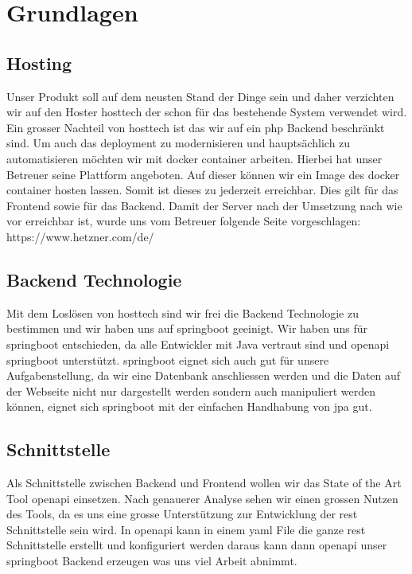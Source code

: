 \documentclass[../main.tex]{subfiles}
\begin{document}
	\section{Grundlagen}
	
	\subsection{Hosting}
	Unser Produkt soll auf dem neusten Stand der Dinge sein und daher verzichten wir auf den Hoster \gls{hosttech} der schon für das bestehende System verwendet wird. Ein grosser Nachteil von \gls{hosttech} ist das wir auf ein \gls{php} Backend beschränkt sind. Um auch das \gls{deployment} zu modernisieren und hauptsächlich zu automatisieren möchten wir mit \gls{docker} \gls{container} arbeiten. Hierbei hat unser Betreuer seine Plattform angeboten. Auf dieser können wir ein Image des \gls{docker} \gls{container} hosten lassen. Somit ist dieses zu jederzeit erreichbar. Dies gilt für das Frontend sowie für das Backend.
	Damit der Server nach der Umsetzung nach wie vor erreichbar ist, wurde uns vom Betreuer folgende Seite vorgeschlagen: https://www.hetzner.com/de/
	
	\subsection{Backend Technologie}
	Mit dem Loslösen von \gls{hosttech} sind wir frei die Backend Technologie zu bestimmen und wir haben uns auf \gls{springboot} geeinigt. Wir haben uns für \gls{springboot} entschieden, da alle Entwickler mit Java vertraut sind und \gls{openapi} \gls{springboot} unterstützt. \gls{springboot} eignet sich auch gut für unsere Aufgabenstellung, da wir eine Datenbank anschliessen werden und die Daten auf der Webseite nicht nur dargestellt werden sondern auch manipuliert werden können, eignet sich \gls{springboot} mit der einfachen Handhabung von \gls{jpa} gut.
	
	\subsection{Schnittstelle}
	Als Schnittstelle zwischen Backend und Frontend wollen wir das State of the Art Tool \gls{openapi} einsetzen. Nach genauerer Analyse sehen wir einen grossen Nutzen des Tools, da es uns eine grosse Unterstützung zur Entwicklung der \gls{rest} Schnittstelle sein wird. In \gls{openapi} kann in einem \gls{yaml} File die ganze \gls{rest} Schnittstelle erstellt und konfiguriert werden daraus kann dann \gls{openapi} unser \gls{springboot} Backend erzeugen was uns viel Arbeit abnimmt.
	
\end{document}
